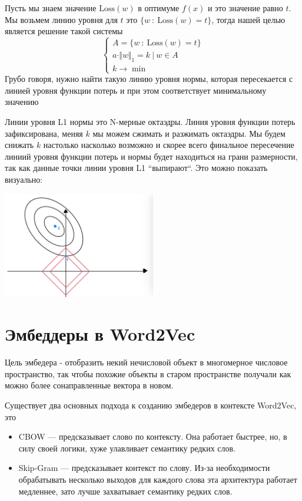 \documentclass{article}
\begin{document}
    Пусть мы знаем значение $\text{Loss}(w)$ в оптимуме $f(x)$ и это значение равно $t$. 
    Мы возьмем линию уровня для $t$ это 
    $ \{w \ : \ \text{Loss}(w) = t \}$, тогда нашей целью является решение такой системы 
    \[
    \begin{cases}
        A = \{w \ : \ \text{Loss}(w) = t \} \\ 
        a \cdot \Vert w \Vert_{1} = k \ | \ w \in A \\
        k \rightarrow \min
    \end{cases}
    \]
    Грубо говоря, нужно найти такую линию уровня нормы, которая пересекается с линией уровня функции потерь 
    и при этом соответствует минимальному значению 

    Линии уровня L1 нормы это N-мерные октаэдры. Линия уровня функции потерь зафиксирована, меняя $k$
    мы можем сжимать и разжимать октаэдры. Мы будем снижать $k$ настолько насколько возможно и скорее всего 
    финальное пересечение линиий уровня функции потерь и нормы будет находиться на грани размерности, так как данные точки 
    линии уровня L1 ``выпирают``. Это можно показать визуально: 

    \begin{center}
        \includegraphics[trim=0cm 0cm 1.5cm 0cm, clip, width=0.5\textwidth]{photos/L1.jpg}
    \end{center}

    


    \section{Эмбеддеры в Word2Vec}
    Цель эмбедера - отобразить некий нечисловой объект в многомерное числовое пространство, так чтобы похожие 
    объекты в старом пространстве получали как можно более сонаправленные вектора в новом. 

    Существует два основных подхода к созданию эмбедеров в контексте Word2Vec, это 
    \begin{itemize}
        \item CBOW --- предсказывает слово по контексту. 
        Она работает быстрее, но, в силу своей логики, хуже улавливает семантику редких слов.
        \item Skip-Gram --- предсказывает контекст по слову. 
        Из-за необходимости обрабатывать несколько выходов для каждого слова 
        эта архитектура работает медленнее, зато лучше захватывает семантику редких слов.  
    \end{itemize}
    
\end{document}
